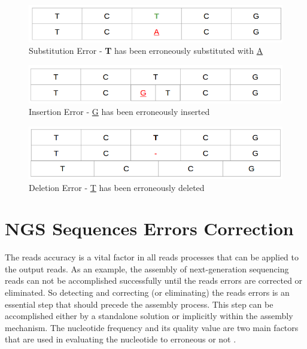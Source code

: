 \documentclass[12pt]{llncs}
\begin{document}
\begin{figure}
	\centering
	\includegraphics[width=.911\linewidth]{./figs/ErrCrr-1}
	\caption{\label{fig:fig-ErrCrr-1}{Substitution Error} - \textbf{T} has been erroneously substituted with \underline{A}}
\end{figure}
\vspace{2cm}
\begin{figure}
	\centering
	\includegraphics[width=.911\linewidth]{./figs/ErrCrr-2}
	\caption{\label{fig:fig-ErrCrr-2}{Insertion Error} - \underline{G} has been erroneously inserted}
\end{figure}
\vspace{2cm}
\begin{figure}
	\centering
	\includegraphics[width=.911\linewidth]{./figs/ErrCrr-3}
	\caption{\label{fig:fig-ErrCrr-3}{Deletion Error} - \underline{T} has been erroneously deleted}
\end{figure}


\newpage
\section{NGS Sequences Errors Correction}
The reads accuracy is a vital factor in all reads processes that can be applied to the output reads. As an example, the assembly of next-generation sequencing reads can not be accomplished successfully until the reads errors are corrected or eliminated. So detecting and correcting (or eliminating) the reads errors is an essential step that should precede the assembly process. This step can be accomplished either by a standalone solution or implicitly within the assembly mechanism. The nucleotide frequency and its quality value are two main factors that are used in evaluating the nucleotide to erroneous or not \cite{ErrCorr}. 
\end{document}
